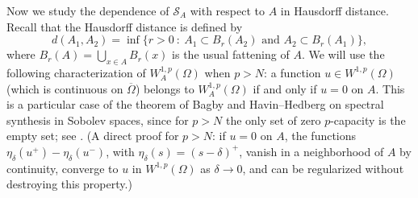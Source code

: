 \documentclass[11pt]{amsart}
\theoremstyle{remark}
\numberwithin{equation}{section}
\newcommand{\cS}{\mathcal{S}}
\begin{document}
Now we study the dependence of $\cS_A$ with respect to $A$ in Hausdorff distance. Recall that the Hausdorff distance is defined by
\[
d(A_1,A_2)=\inf\{r>0\ :\ A_1\subset B_r(A_2)\text{ and }A_2\subset B_r(A_1)\},
\]
where $B_r(A)=\bigcup_{x\in A}B_r(x)$ is the usual fattening of $A$. We will use the following characterization of $W^{1,p}_A(\Omega)$ when $p>N$: a function $u\in W^{1,p}(\Omega)$ (which is continuous on $\overline\Omega$) belongs to $W^{1,p}_A(\Omega)$ if and only if $u=0$ on $A$. This is a particular case of the theorem of Bagby and Havin--Hedberg on spectral synthesis in Sobolev spaces, since for $p>N$ the only set of zero $p$-capacity is the empty set; see \cite[Chapter~9]{AH}. (A direct proof for $p>N$: if $u=0$ on $A$, the functions $\eta_\delta(u^+)-\eta_\delta(u^-)$, with $\eta_\delta(s)=(s-\delta)^+$, vanish in a neighborhood of $A$ by continuity, converge to $u$ in $W^{1,p}(\Omega)$ as $\delta\to0$, and can be regularized without destroying this property.)
\end{document}
